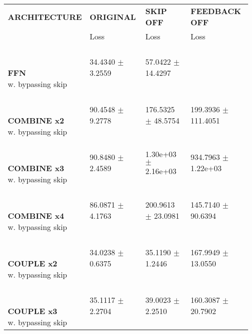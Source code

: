 
\begin{table}[ht]
    \centering
    \begin{tabular}{|>{\columncolor{gray!05}}l|l|l|l|}
        \hline
        \rowcolor{white}
        \textbf{\footnotesize ARCHITECTURE} & \textbf{\footnotesize ORIGINAL} & \textbf{\footnotesize SKIP OFF} & \textbf{\footnotesize FEEDBACK OFF} \\

        \rowcolor{white}
        & {\footnotesize Loss} & {\footnotesize Loss} & {\footnotesize Loss} \\
        \hline
\shortstack[l]{\\ {} \\ \textbf{\footnotesize FFN}\\{\footnotesize w. bypassing skip}} & 34.4340 $\pm$ 3.2559 & 57.0422 $\pm$ 14.4297 &  \\
 \hline 
\shortstack[l]{\\ {} \\ \textbf{\footnotesize COMBINE x2}\\{\footnotesize w. bypassing skip}} & 90.4548 $\pm$ 9.2778 & 176.5325 $\pm$ 48.5754 & 199.3936 $\pm$ 111.4051 \\
 \hline 
\shortstack[l]{\\ {} \\ \textbf{\footnotesize COMBINE x3}\\{\footnotesize w. bypassing skip}} & 90.8480 $\pm$ 2.4589 & 1.30e+03 $\pm$ 2.16e+03 & 934.7963 $\pm$ 1.22e+03 \\
 \hline 
\shortstack[l]{\\ {} \\ \textbf{\footnotesize COMBINE x4}\\{\footnotesize w. bypassing skip}} & 86.0871 $\pm$ 4.1763 & 200.9613 $\pm$ 23.0981 & 145.7140 $\pm$ 90.6394 \\
 \hline 
\shortstack[l]{\\ {} \\ \textbf{\footnotesize COUPLE x2}\\{\footnotesize w. bypassing skip}} & 34.0238 $\pm$ 0.6375 & 35.1190 $\pm$ 1.2446 & 167.9949 $\pm$ 13.0550 \\
 \hline 
\shortstack[l]{\\ {} \\ \textbf{\footnotesize COUPLE x3}\\{\footnotesize w. bypassing skip}} & 35.1117 $\pm$ 2.2704 & 39.0023 $\pm$ 2.2510 & 160.3087 $\pm$ 20.7902 \\
 \hline 

\end{tabular}
\end{table}
